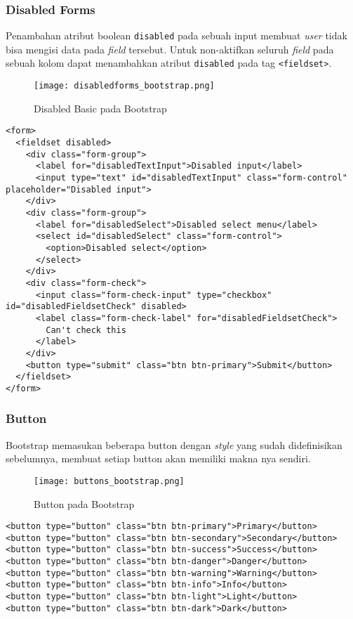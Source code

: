 {\subsubsection{Disabled Forms}
Penambahan atribut boolean \texttt{disabled} pada sebuah input membuat \textit{user} tidak bisa mengisi data pada \textit{field} tersebut. Untuk non-aktifkan seluruh \textit{field} pada sebuah kolom dapat menambahkan atribut \texttt{disabled} pada tag \texttt{<fieldset>}.
\begin{figure} [H]
	\centering  
	\texttt{[image: disabledforms\_bootstrap.png]}  
	\caption{Disabled Basic pada Bootstrap} 
\end{figure}
\begin{lstlisting}[frame=single, basicstyle=\tiny] 
<form>
  <fieldset disabled>
    <div class="form-group">
      <label for="disabledTextInput">Disabled input</label>
      <input type="text" id="disabledTextInput" class="form-control" placeholder="Disabled input">
    </div>
    <div class="form-group">
      <label for="disabledSelect">Disabled select menu</label>
      <select id="disabledSelect" class="form-control">
        <option>Disabled select</option>
      </select>
    </div>
    <div class="form-check">
      <input class="form-check-input" type="checkbox" id="disabledFieldsetCheck" disabled>
      <label class="form-check-label" for="disabledFieldsetCheck">
        Can't check this
      </label>
    </div>
    <button type="submit" class="btn btn-primary">Submit</button>
  </fieldset>
</form>
\end{lstlisting}
\subsubsection{Button}
Bootstrap memasukan beberapa button dengan \textit{style} yang sudah didefinisikan sebelumnya, membuat setiap button akan memiliki makna nya sendiri.
\begin{figure} [H]
	\centering  
	\texttt{[image: buttons\_bootstrap.png]}  
	\caption{Button pada Bootstrap} 
\end{figure}
\begin{lstlisting}[frame=single] 
<button type="button" class="btn btn-primary">Primary</button>
<button type="button" class="btn btn-secondary">Secondary</button>
<button type="button" class="btn btn-success">Success</button>
<button type="button" class="btn btn-danger">Danger</button>
<button type="button" class="btn btn-warning">Warning</button>
<button type="button" class="btn btn-info">Info</button>
<button type="button" class="btn btn-light">Light</button>
<button type="button" class="btn btn-dark">Dark</button>


\end{lstlisting}}
